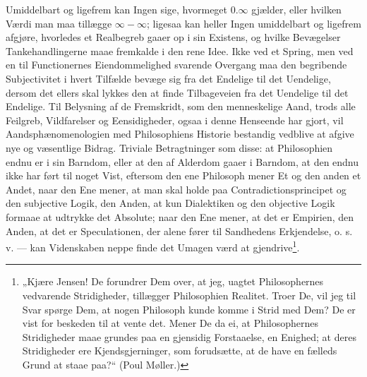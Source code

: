 \documentclass[11pt]{book}
\newcommand{\opage}[1]{\marginnote{\footnotesize\textit{[#1]}}}
\begin{document}
Umiddelbart og ligefrem kan Ingen sige, hvormeget $0 . \infty$ gjælder,
eller hvilken Værdi man maa tillægge $\infty - \infty$; ligesaa kan
heller Ingen umiddelbart og ligefrem afgjøre, hvorledes et Realbegreb
gaaer op i sin Existens, og hvilke Bevægelser Tankehandlingerne maae
fremkalde i den rene Idee. Ikke ved et Spring, men ved en til
Functionernes Eiendommelighed svarende Overgang maa den begribende
Subjectivitet i hvert Tilfælde bevæge sig fra det Endelige til det
Uendelige, dersom det ellers skal lykkes den at finde Tilbageveien fra
det Uendelige til det Endelige. Til Belysning af de Fremskridt, som den
menneskelige Aand, trods alle Feilgreb, Vildfarelser og Eensidigheder,
ogsaa i denne Henseende har gjort, vil Aandsphænomenologien med
Philosophiens Historie bestandig vedblive at afgive nye og væsentlige
Bidrag. Triviale Betragtninger som disse: at Philosophien endnu er
\opage{231} \setcounter{footnote}{0}%
i sin Barndom, eller at den af Alderdom gaaer i Barndom, at den endnu
ikke har ført til noget Vist, eftersom den ene Philosoph mener Et og den
anden et Andet, naar den Ene mener, at man skal holde paa
Contradictionsprincipet og den subjective Logik, den Anden, at kun
Dialektiken og den objective Logik formaae at udtrykke det Absolute;
naar den Ene mener, at det er Empirien, den Anden, at det er
Speculationen, der alene fører til Sandhedens Erkjendelse, o. s. v. ---
kan Videnskaben neppe finde det Umagen værd at
gjendrive\footnote{„Kjære Jensen! De forundrer Dem over, at jeg, uagtet
Philosophernes vedvarende Stridigheder, tillægger Philosophien Realitet.
Troer De, vil jeg til Svar spørge Dem, at nogen Philosoph kunde komme i
Strid med Dem? De er vist for beskeden til at vente det. Mener De da ei,
at Philosophernes Stridigheder maae grundes paa en gjensidig
Forstaaelse, en Enighed; at deres Stridigheder ere Kjendsgjerninger, som
forudsætte, at de have en fælleds Grund at staae paa?“ (Poul
Møller.)}.%
\end{document}
